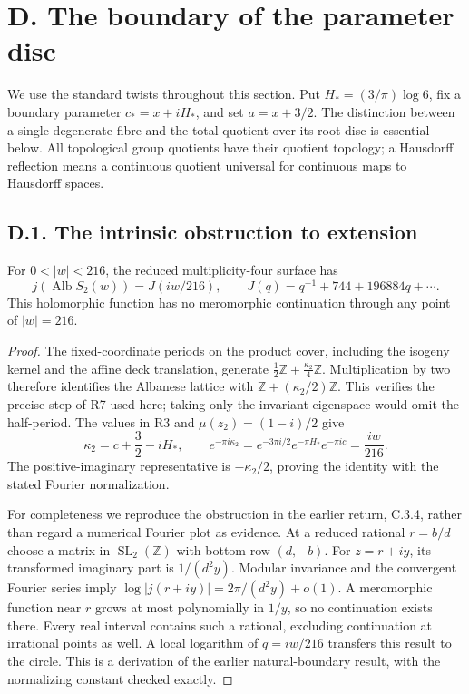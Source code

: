 \section{D. The boundary of the parameter disc}

We use the standard twists throughout this section. Put
\(H_*=(3/\pi)\log6\), fix a boundary parameter
\(c_*=x+iH_*\), and set \(a=x+3/2\). The distinction between a
single degenerate fibre and the total quotient over its root disc is
essential below. All topological group quotients have their quotient
topology; a Hausdorff reflection means a continuous quotient universal
for continuous maps to Hausdorff spaces.

\subsection{D.1. The intrinsic obstruction to extension}

\begin{proposition}\label{push:src:D.1.1}
For \(0<|w|<216\), the reduced multiplicity-four surface has
\[
 j(\operatorname{Alb}S_2(w))=J(iw/216),\qquad
 J(q)=q^{-1}+744+196884q+\cdots.
\]
This holomorphic function has no meromorphic continuation through any
point of \(|w|=216\).
\end{proposition}
\begin{proof}
The fixed-coordinate periods on the product cover, including the
isogeny kernel and the affine deck translation, generate
\(\frac12\mathbb Z+\frac{\kappa_2}{4}\mathbb Z\).
Multiplication by two therefore identifies the Albanese lattice with
\(\mathbb Z+(\kappa_2/2)\mathbb Z\). This verifies the precise step of
R7 used here; taking only the invariant eigenspace would omit the
half-period. The values in R3 and \(\mu(z_2)=(1-i)/2\) give
\[
 \kappa_2=c+\frac32-iH_*,\qquad
 e^{-\pi i\kappa_2}=e^{-3\pi i/2}e^{-\pi H_*}e^{-\pi ic}
 =\frac{iw}{216}.
\]
The positive-imaginary representative is \(-\kappa_2/2\), proving the
identity with the stated Fourier normalization.

For completeness we reproduce the obstruction in the earlier return,
C.3.4, rather than regard a numerical Fourier plot as evidence. At a
reduced rational \(r=b/d\) choose a matrix in
\(\operatorname{SL}_2(\mathbb Z)\) with bottom row \((d,-b)\).
For \(z=r+iy\), its transformed imaginary part is \(1/(d^2y)\).
Modular invariance and the convergent Fourier series imply
\(\log|j(r+iy)|=2\pi/(d^2y)+o(1)\).
A meromorphic function near \(r\) grows at most polynomially in
\(1/y\), so no continuation exists there. Every real interval contains
such a rational, excluding continuation at irrational points as well.
A local logarithm of \(q=iw/216\) transfers this result to the circle.
This is a derivation of the earlier natural-boundary result, with the
normalizing constant checked exactly.
\end{proof}

